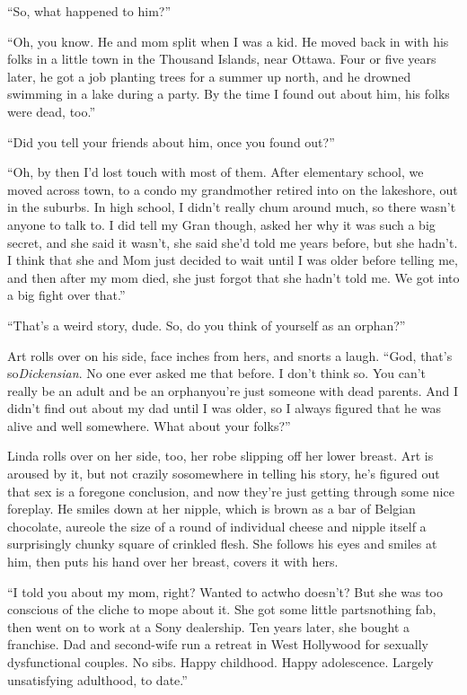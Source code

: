 “So, what happened to him?”

“Oh, you know. He and mom split when I was a kid. He moved back in
with his folks in a little town in the Thousand Islands, near
Ottawa. Four or five years later, he got a job planting trees for a
summer up north, and he drowned swimming in a lake during a party.
By the time I found out about him, his folks were dead, too.”

“Did you tell your friends about him, once you found out?”

“Oh, by then I’d lost touch with most of them. After elementary
school, we moved across town, to a condo my grandmother retired
into on the lakeshore, out in the suburbs. In high school, I didn’t
really chum around much, so there wasn’t anyone to talk to. I did
tell my Gran though, asked her why it was such a big secret, and
she said it wasn’t, she said she’d told me years before, but she
hadn’t. I think that she and Mom just decided to wait until I was
older before telling me, and then after my mom died, she just
forgot that she hadn’t told me. We got into a big fight over
that.”

“That’s a weird story, dude. So, do you think of yourself as an
orphan?”

Art rolls over on his side, face inches from hers, and snorts a
laugh. “God, that’s so{\dash}\emph{Dickensian}. No one ever asked me that
before. I don’t think so. You can’t really be an adult and be an
orphan{\dash}you’re just someone with dead parents. And I didn’t find out
about my dad until I was older, so I always figured that he was
alive and well somewhere. What about your folks?”

Linda rolls over on her side, too, her robe slipping off her lower
breast. Art is aroused by it, but not crazily so{\dash}somewhere in
telling his story, he’s figured out that sex is a foregone
conclusion, and now they’re just getting through some nice
foreplay. He smiles down at her nipple, which is brown as a bar of
Belgian chocolate, aureole the size of a round of individual cheese
and nipple itself a surprisingly chunky square of crinkled flesh.
She follows his eyes and smiles at him, then puts his hand over her
breast, covers it with hers.

“I told you about my mom, right? Wanted to act{\dash}who doesn’t? But she
was too conscious of the cliche to mope about it. She got some
little parts{\dash}nothing fab, then went on to work at a Sony
dealership. Ten years later, she bought a franchise. Dad and
second-wife run a retreat in West Hollywood for sexually
dysfunctional couples. No sibs. Happy childhood. Happy adolescence.
Largely unsatisfying adulthood, to date.”

